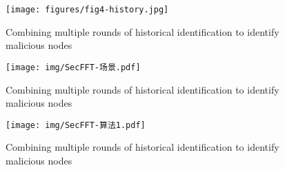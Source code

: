 \documentclass[lettersize,journal]{IEEEtran}
\begin{document}

\begin{figure}[!t]
\centering
\texttt{[image: figures/fig4-history.jpg]}
\caption{Combining multiple rounds of historical identification to identify malicious nodes
}
\label{fig4:history}
\end{figure}


\begin{figure}[!t]
\centering
\texttt{[image: img/SecFFT-场景.pdf]}
\caption{Combining multiple rounds of historical identification to identify malicious nodes
}
\label{fig4:history}
\end{figure}


\begin{figure}[!t]
\centering
\texttt{[image: img/SecFFT-算法1.pdf]}
\caption{Combining multiple rounds of historical identification to identify malicious nodes
}
\label{fig4:history}
\end{figure}
\end{document}
